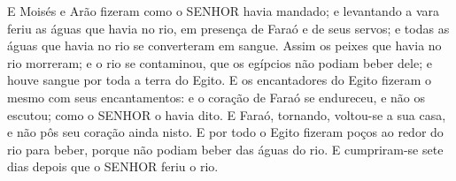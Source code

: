 {  E Moisés e Arão fizeram como o SENHOR havia mandado; e levantando a vara feriu as águas que havia no rio, em presença de Faraó e de seus servos; e todas as águas que havia no rio se converteram em sangue.
  Assim os peixes que havia no rio morreram; e o rio se contaminou, que os egípcios não podiam beber dele; e houve sangue por toda a terra do Egito.
  E os encantadores do Egito fizeram o mesmo com seus encantamentos: e o coração de Faraó se endureceu, e não os escutou; como o SENHOR o havia dito.
  E Faraó, tornando, voltou-se a sua casa, e não pôs seu coração ainda nisto.
  E por todo o Egito fizeram poços ao redor do rio para beber, porque não podiam beber das águas do rio.
  E cumpriram-se sete dias depois que o SENHOR feriu o rio.
\par }

